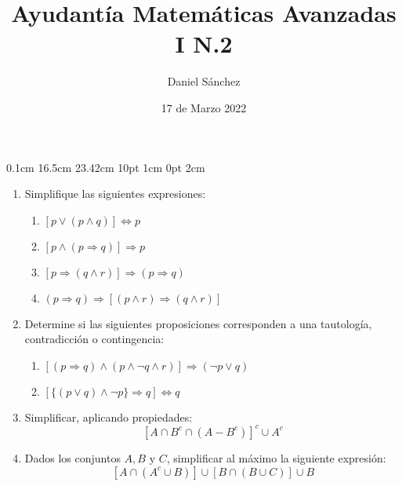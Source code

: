 \documentclass[12pt]{article}
\begin{document}
\setmargins{2.5cm}
{0.1cm}
{16.5cm}
{23.42cm}
{10pt}
{1cm}
{0pt}
{2cm}

\title{Ayudant\'ia Matem\'aticas Avanzadas I N.2}
\date{17 de Marzo 2022}
\author{Daniel S\'anchez}
\maketitle

\begin{enumerate}
    \item Simplifique las siguientes expresiones:
          \begin{enumerate}
              \item $[p \lor (p \land q)] \Leftrightarrow p$
              \item $[p \land (p \Rightarrow q)] \Rightarrow p$
              \item $[p \Rightarrow (q \land r)] \Rightarrow (p \Rightarrow q)$
              \item $(p \Rightarrow q) \Rightarrow [(p \land r) \Rightarrow (q \land r)]$
          \end{enumerate}
    \item Determine si las siguientes proposiciones corresponden a una tautolog\'ia, contradicci\'on o contingencia:
          \begin{enumerate}
              \item $[(p \Rightarrow q) \land (p \land \neg{q} \land r)] \Rightarrow (\neg{p} \lor q)$
              \item $[\{(p \lor q) \land \neg{p}\}\Rightarrow q] \Leftrightarrow q$
          \end{enumerate}
    \item Simplificar, aplicando propiedades:
          $$[A \cap B^{c} \cap (A-B^{c})]^{c} \cup A^{c}$$
    \item Dados los conjuntos $A, B \mbox{ y } C$, simplificar al m\'aximo la siguiente expresi\'on:
          $$[A \cap (A^{c} \cup B)] \cup [B \cap (B \cup C)] \cup B$$
\end{enumerate}
\end{document}
